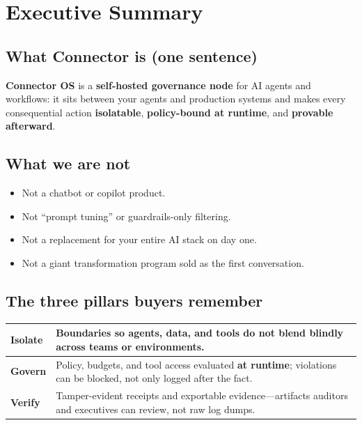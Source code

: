 \chapter{Executive Summary}

\section{What Connector is (one sentence)}

\textbf{Connector OS} is a \textbf{self-hosted governance node} for AI agents and workflows: it sits between your agents and production systems and makes every consequential action \textbf{isolatable}, \textbf{policy-bound at runtime}, and \textbf{provable afterward}.

\section{What we are not}

\begin{itemize}
  \item Not a chatbot or copilot product.
  \item Not ``prompt tuning'' or guardrails-only filtering.
  \item Not a replacement for your entire AI stack on day one.
  \item Not a giant transformation program sold as the first conversation.
\end{itemize}

\section{The three pillars buyers remember}

\begin{center}
\renewcommand{\arraystretch}{1.45}
\begin{tabularx}{0.95\textwidth}{@{}>{\bfseries}p{} X@{}}
\toprule
Isolate & Boundaries so agents, data, and tools do not blend blindly across teams or environments. \\
\midrule
Govern & Policy, budgets, and tool access evaluated \textbf{at runtime}; violations can be blocked, not only logged after the fact. \\
\midrule
Verify & Tamper-evident receipts and exportable evidence---artifacts auditors and executives can review, not raw log dumps. \\
\bottomrule
\end{tabularx}
\end{center}

